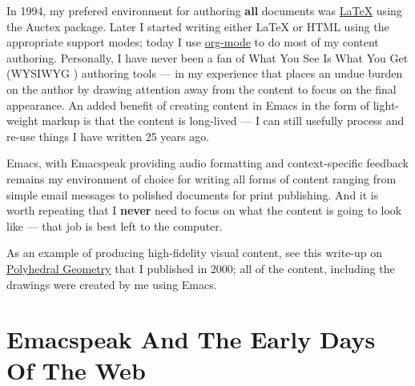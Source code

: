 \documentclass[11pt]{article}
\begin{document}
In 1994, my prefered environment for authoring \textbf{all} documents
was \uline{\LaTeX{}} using the Auctex package. Later I started writing
either \LaTeX{} or HTML using the appropriate support modes; today I
use \uline{org-mode} to do most of my content authoring. Personally, I
have never been a fan of What You See Is What You Get (WYSIWYG )
authoring tools   —   in my experience that places an undue burden
on the author by  drawing attention away from the content
to focus on the final appearance. An added benefit  of creating
content in Emacs in the form of light-weight markup  is that the
content is long-lived   —   I can still usefully process and re-use
things I have written 25 years ago.

Emacs, with Emacspeak providing audio formatting and
context-specific feedback remains my environment of choice for
writing all forms of content ranging from simple email messages
to polished documents for print publishing. And it is worth
repeating that I \textbf{never} need to focus on what the content is
going to look like   —   that job is best left to the computer.

As an example of producing high-fidelity visual content, see
this write-up on \href{http://emacspeak.sourceforge.net/raman/publications/polyhedra/}{Polyhedral Geometry} that  I published in 2000;
all of the content, including the drawings were created by me
using Emacs. 

\section{Emacspeak And The Early Days Of The Web}
\label{sec-7}
\end{document}
